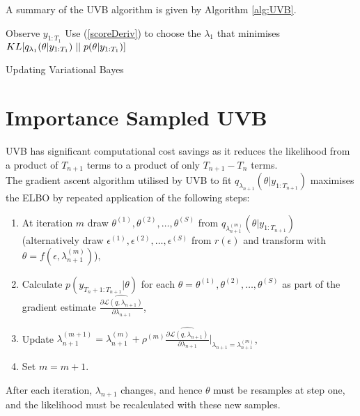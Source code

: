 \documentclass[12pt,a4paper]{article}\usepackage[]{graphicx}\usepackage[]{color}
\begin{document}
A summary of the UVB algorithm is given by Algorithm \ref{alg:UVB}.

\begin{algorithm}[H]
 Observe $y_{1:T_1}$\;
 Use (\ref{scoreDeriv}) to choose the $\lambda_1$ that minimises $KL[q_{\lambda_1}(\theta |y_{1:T_1})\hspace{.1cm}||\hspace{.1cm}p(\theta |y_{1:T_1})]$\;
 \caption{Updating Variational Bayes}
  \label{alg:UVB}
\end{algorithm}

\section{Importance Sampled UVB} 
\label{sec:UVBIS}

UVB has significant computational cost savings as it reduces the likelihood from a product of $T_{n+1}$ terms to a product of only $T_{n+1} - T_n$ terms. \\

The gradient ascent algorithm utilised by UVB to fit $q_{\lambda_{n+1}}(\theta | y_{1:T_{n+1}})$ maximises the ELBO by repeated application of the following steps:
\begin{enumerate}
\item At iteration $m$ draw $\theta^{(1)}, \theta^{(2)}, \ldots, \theta^{(S)}$ from $q_{\lambda_{n+1}^{(m)}}(\theta | y_{1:T_{n+1}})$ \\
(alternatively draw $\epsilon^{(1)}, \epsilon^{(2)}, \ldots, \epsilon^{(S)}$ from $r(\epsilon)$ and transform with $\theta = f(\epsilon, \lambda^{(m)}_{n+1})$),
\item Calculate $p(y_{T_{n}+1:T_{n+1}} | \theta)$ for each $\theta = \theta^{(1)}, \theta^{(2)}, \ldots, \theta^{(S)}$ as part of the gradient estimate $\widehat{\frac{\partial\mathcal{L}(q, \lambda_{n+1})}{\partial \lambda_{n+1}}}$,
\item Update $\lambda_{n+1}^{(m+1)} = \lambda_{n+1}^{(m)} + \rho^{(m)}\widehat{\frac{\partial\mathcal{L}(q, \lambda_{n+1})}{\partial \lambda_{n+1}}} \bigg\rvert_{\lambda_{n+1} = \lambda^{(m)}_{n+1}}$,
\item Set $m = m + 1$.
\end{enumerate}
After each iteration, $\lambda_{n+1}$ changes, and hence $\theta$ must be resamples at step one, and the likelihood must be recalculated with these new samples. 
\\
\end{document}
